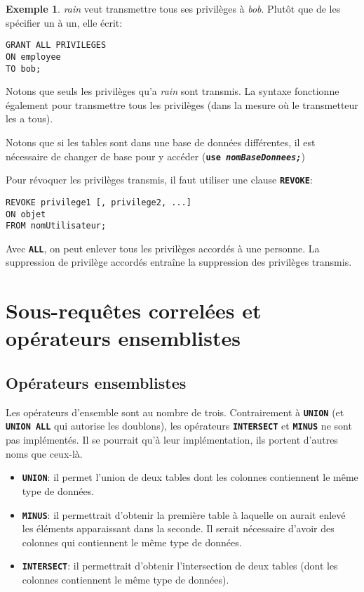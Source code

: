 \documentclass[a4paper, 12pt]{report}
\newcommand{\textSQL}[1]{\texttt{\textbf{#1}}}
\theoremstyle{definition} \newtheorem{ex}{Exemple}
\begin{document}
\begin{ex}
\emph{rain} veut transmettre tous ses privilèges à \emph{bob}. Plutôt que de les spécifier un à un, elle écrit:
\begin{lstlisting}[frame=single]
GRANT ALL PRIVILEGES
ON employee
TO bob;
\end{lstlisting}
Notons que seuls les privilèges qu'a \emph{rain} sont transmis. La syntaxe fonctionne également pour transmettre tous les privilèges (dans la mesure où le transmetteur les a tous).
\end{ex}

Notons que si les tables sont dans une base de données différentes, il est nécessaire de changer de base pour y accéder (\textSQL{use \emph{nomBaseDonnees;}})

Pour révoquer les privilèges transmis, il faut utiliser une clause \textSQL{REVOKE}:
\begin{lstlisting}[frame=single]
REVOKE privilege1 [, privilege2, ...]
ON objet
FROM nomUtilisateur;
\end{lstlisting}
Avec \textSQL{ALL}, on peut enlever tous les privilèges accordés à une personne. La suppression de privilège accordés entraîne la suppression des privilèges transmis.

\chapter{Sous-requêtes correlées et opérateurs ensemblistes}
\section{Opérateurs ensemblistes}

Les opérateurs d'ensemble sont au nombre de trois. Contrairement à \textSQL{UNION} (et \textSQL{UNION ALL} qui autorise les doublons), les opérateurs \textSQL{INTERSECT} et \textSQL{MINUS} ne sont pas implémentés. Il se pourrait qu'à leur implémentation, ils portent d'autres noms que ceux-là.
\begin{itemize}
\item \textSQL{UNION}: il permet l'union de deux tables dont les colonnes contiennent le même type de données.
\item \textSQL{MINUS}: il permettrait d'obtenir la première table à laquelle on aurait enlevé les éléments apparaissant dans la seconde. Il serait nécessaire d'avoir des colonnes qui contiennent le même type de données.
\item \textSQL{INTERSECT}: il permettrait d'obtenir l'intersection de deux tables (dont les colonnes contiennent le même type de données).
\end{itemize}
\end{document}
